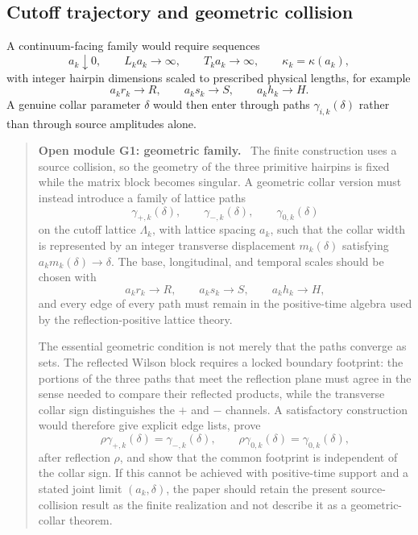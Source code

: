 \documentclass[11pt]{article}
\newenvironment{openmodule}[1]
{\begin{quote}\color{red!55!black}\textbf{Open module #1.}\ }
{\end{quote}}
\begin{document}
\subsection{Cutoff trajectory and geometric collision}

A continuum-facing family would require sequences
\begin{equation}
  a_k\downarrow0,
  \qquad
  L_ka_k\longrightarrow\infty,
  \qquad
  T_ka_k\longrightarrow\infty,
  \qquad
  \kappa_k=\kappa(a_k),
  \label{eq:cutoff-trajectory}
\end{equation}
with integer hairpin dimensions scaled to prescribed physical lengths, for example
\begin{equation}
  a_kr_k\to R,
  \qquad
  a_ks_k\to S,
  \qquad
  a_kh_k\to H.
  \label{eq:physical-loop-scaling}
\end{equation}
A genuine collar parameter $\delta$ would then enter through paths $\gamma_{i,k}(\delta)$ rather than through source amplitudes alone.

\begin{openmodule}{G1: geometric family}
The finite construction uses a source collision, so the geometry of the three primitive hairpins is fixed while the matrix block becomes singular.  A geometric collar version must instead introduce a family of lattice paths
\[
  \gamma_{+,k}(\delta),\qquad
  \gamma_{-,k}(\delta),\qquad
  \gamma_{0,k}(\delta)
\]
on the cutoff lattice \(\Lambda_k\), with lattice spacing \(a_k\), such that the collar width is represented by an integer transverse displacement \(m_k(\delta)\) satisfying \(a_km_k(\delta)\to\delta\).  The base, longitudinal, and temporal scales should be chosen with
\[
  a_kr_k\to R,\qquad a_ks_k\to S,\qquad a_kh_k\to H,
\]
and every edge of every path must remain in the positive-time algebra used by the reflection-positive lattice theory.

The essential geometric condition is not merely that the paths converge as sets.  The reflected Wilson block requires a locked boundary footprint: the portions of the three paths that meet the reflection plane must agree in the sense needed to compare their reflected products, while the transverse collar sign distinguishes the \(+\) and \(-\) channels.  A satisfactory construction would therefore give explicit edge lists, prove
\[
  \rho\gamma_{+,k}(\delta)=\gamma_{-,k}(\delta),
  \qquad
  \rho\gamma_{0,k}(\delta)=\gamma_{0,k}(\delta),
\]
after reflection \(\rho\), and show that the common footprint is independent of the collar sign.  If this cannot be achieved with positive-time support and a stated joint limit \((a_k,\delta)\), the paper should retain the present source-collision result as the finite realization and not describe it as a geometric-collar theorem.
\end{openmodule}
\end{document}
